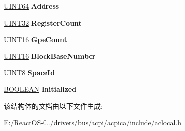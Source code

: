 \begin{DoxyCompactItemize}
\item 
\mbox{\label{structacpi__gpe__block__info_ad6e43009dd85168b3e0b35157c39340b}} 
\hyperlink{_processor_bind_8h_a57be03562867144161c1bfee95ca8f7c}{U\+I\+N\+T64} {\bfseries Address}
\item 
\mbox{\label{structacpi__gpe__block__info_a2deb68a260554324325f45380287a575}} 
\hyperlink{_processor_bind_8h_ae1e6edbbc26d6fbc71a90190d0266018}{U\+I\+N\+T32} {\bfseries Register\+Count}
\item 
\mbox{\label{structacpi__gpe__block__info_a3e034e4d46bd2d59f04b8e2861087493}} 
\hyperlink{_processor_bind_8h_a09f1a1fb2293e33483cc8d44aefb1eb1}{U\+I\+N\+T16} {\bfseries Gpe\+Count}
\item 
\mbox{\label{structacpi__gpe__block__info_a1a55632e179d8c48c8fc62aa6c66adbf}} 
\hyperlink{_processor_bind_8h_a09f1a1fb2293e33483cc8d44aefb1eb1}{U\+I\+N\+T16} {\bfseries Block\+Base\+Number}
\item 
\mbox{\label{structacpi__gpe__block__info_a0e75feee674cda551f2c1beae7595a24}} 
\hyperlink{_processor_bind_8h_ab27e9918b538ce9d8ca692479b375b6a}{U\+I\+N\+T8} {\bfseries Space\+Id}
\item 
\mbox{\label{structacpi__gpe__block__info_a7383a1b597058ee23bf7c22fa0d250eb}} 
\hyperlink{_processor_bind_8h_a112e3146cb38b6ee95e64d85842e380a}{B\+O\+O\+L\+E\+AN} {\bfseries Initialized}
\end{DoxyCompactItemize}


该结构体的文档由以下文件生成\+:\begin{DoxyCompactItemize}
\item 
E\+:/\+React\+O\+S-\/0../drivers/bus/acpi/acpica/include/aclocal.\+h\end{DoxyCompactItemize}
